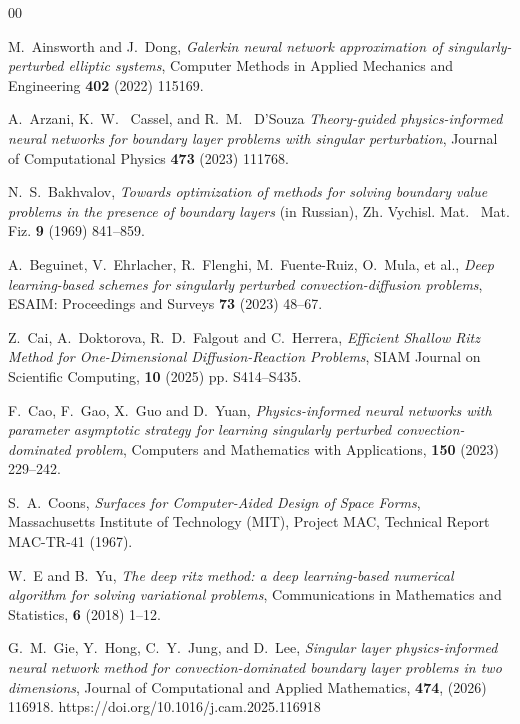 \documentclass[11pt]{article}
\theoremstyle{plain}
\theoremstyle{definition}
\theoremstyle{remark}
\numberwithin{equation}{section}
\begin{document}
\vspace{0.2cm}
\noindent


%
%
\begin{thebibliography}{00}


 M.~Ainsworth and J.~Dong, \emph{Galerkin neural network 
approximation of singularly-perturbed elliptic systems}, Computer Methods
in Applied Mechanics and Engineering \textbf{402} (2022) 115169.

 A.~Arzani, K.~W. ~Cassel, and R.~M. ~D'Souza \emph{Theory-guided physics-informed neural networks for boundary layer problems with singular perturbation}, Journal of Computational Physics \textbf{473} (2023) 111768.

 N.~S.~Bakhvalov, \emph{Towards optimization of methods for
solving boundary value problems in the presence of boundary layers} (in
Russian), Zh. Vychisl. Mat. \ Mat. Fiz. \textbf{9} (1969) 841--859.

 A.~Beguinet, V.~Ehrlacher, R.~Flenghi, M.~Fuente-Ruiz, O.~Mula, et al., \emph{Deep learning-based schemes for singularly perturbed convection-diffusion problems}, ESAIM: Proceedings and Surveys \textbf{73} (2023) 48--67.

Z.~Cai, A.~Doktorova, R.~D.~Falgout and C.~Herrera, \emph{Efficient Shallow Ritz Method for One-Dimensional Diffusion-Reaction Problems}, SIAM Journal on Scientific Computing, \textbf{10} (2025) pp. S414–S435.

 F.~Cao, F.~Gao, X.~Guo and D.~Yuan, \emph{Physics-informed neural networks with parameter asymptotic strategy for learning singularly perturbed convection-dominated problem}, Computers and Mathematics with Applications, \textbf{150} (2023) 229--242.

 S.~A.~Coons, \emph{Surfaces for Computer-Aided Design of Space Forms}, Massachusetts Institute of Technology (MIT), Project MAC, Technical Report MAC-TR-41 (1967).

 W.~E and B.~Yu, \emph{The deep ritz method: a deep learning-based numerical algorithm for solving
variational problems}, Communications in Mathematics and Statistics, \textbf{6} (2018)  1--12.

G.~M.~Gie, Y.~Hong, C.~Y.~Jung, and D.~Lee, \emph{Singular layer physics-informed neural network method for convection-dominated boundary layer problems in two dimensions}, Journal of Computational and Applied Mathematics, \textbf{474}, (2026) 116918.
https://doi.org/10.1016/j.cam.2025.116918


\end{thebibliography}
\end{document}
